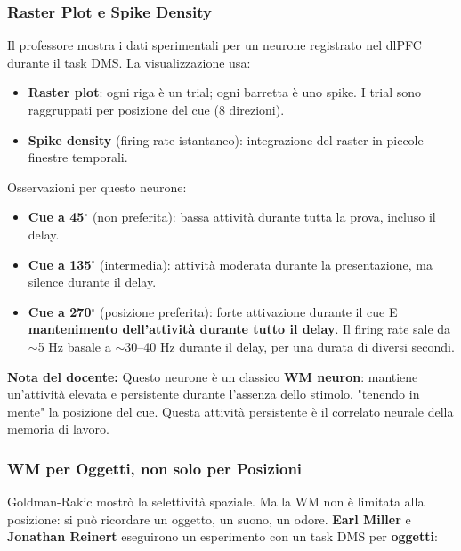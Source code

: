\subsubsection{Raster Plot e Spike Density}

Il professore mostra i dati sperimentali per un neurone registrato nel dlPFC durante il task DMS. La visualizzazione usa:
\begin{itemize}
    \item \textbf{Raster plot}: ogni riga è un trial; ogni barretta è uno spike. I trial sono raggruppati per posizione del cue (8 direzioni).
    \item \textbf{Spike density} (firing rate istantaneo): integrazione del raster in piccole finestre temporali.
\end{itemize}

Osservazioni per questo neurone:
\begin{itemize}
    \item \textbf{Cue a 45$^\circ$} (non preferita): bassa attività durante tutta la prova, incluso il delay.
    \item \textbf{Cue a 135$^\circ$} (intermedia): attività moderata durante la presentazione, ma silence durante il delay.
    \item \textbf{Cue a 270$^\circ$} (posizione preferita): forte attivazione durante il cue E \textbf{mantenimento dell'attività durante tutto il delay}. Il firing rate sale da $\sim$5 Hz basale a $\sim$30–40 Hz durante il delay, per una durata di diversi secondi.
\end{itemize}

\begin{tcolorbox}[colback=gray!5, colframe=gray!40, arc=2mm, boxrule=0.5pt]
\textbf{Nota del docente:} Questo neurone è un classico \textbf{WM neuron}: mantiene un'attività elevata e persistente durante l'assenza dello stimolo, "tenendo in mente" la posizione del cue. Questa attività persistente è il correlato neurale della memoria di lavoro.
\end{tcolorbox}



\subsubsection{WM per Oggetti, non solo per Posizioni}

Goldman-Rakic mostrò la selettività spaziale. Ma la WM non è limitata alla posizione: si può ricordare un oggetto, un suono, un odore. \textbf{Earl Miller} e \textbf{Jonathan Reinert} eseguirono un esperimento con un task DMS per \textbf{oggetti}:

